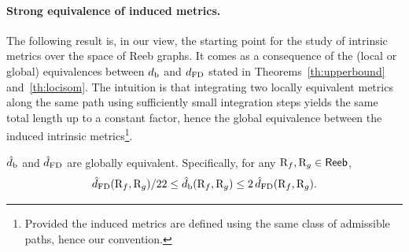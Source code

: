 \paragraph*{Strong equivalence of induced metrics.} The following result is, in our view, the starting point for the study
of intrinsic metrics over the space of Reeb graphs. It comes as a
consequence of the (local or global) equivalences between $d_{\rm b}$ and
$d_{\rm FD}$ stated in Theorems~\ref{th:upperbound} and~\ref{th:locisom}.
The intuition is that integrating two locally equivalent metrics along
the same path using sufficiently small integration steps
yields the same total length up to a constant factor, hence the
global equivalence between the induced intrinsic
metrics\footnote{Provided the induced metrics are defined using the
  same class of admissible paths, hence our convention.}.


\begin{thm}\label{th:strongeq}
$\hat d_{\rm b}$ and $\hat d_{\rm FD}$ are globally equivalent. Specifically, for any $\mathrm{R}_f,\mathrm{R}_g\in{\sf Reeb}$,
\begin{equation}\label{eq:strongeq}
\hat d_{\rm FD}(\mathrm{R}_f,\mathrm{R}_g)/22\leq \hat d_{\rm b}(\mathrm{R}_f,\mathrm{R}_g)\leq 2\,\hat d_{\rm FD}(\mathrm{R}_f,\mathrm{R}_g).
\end{equation}
\end{thm}


